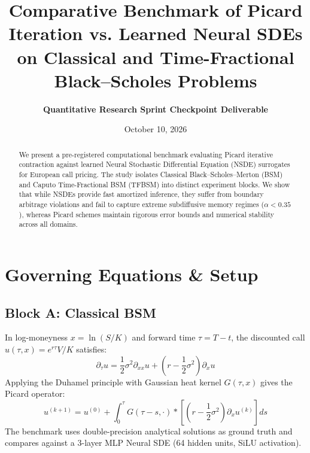 \documentclass[10pt,twocolumn,a4paper]{article}
\title{\textbf{Comparative Benchmark of Picard Iteration vs. Learned Neural SDEs on Classical and Time-Fractional Black--Scholes Problems}}
\author{\textbf{Quantitative Research Sprint Checkpoint Deliverable}}
\date{October 10, 2026}
\begin{document}
\maketitle

\begin{abstract}
We present a pre-registered computational benchmark evaluating Picard iterative contraction against learned Neural Stochastic Differential Equation (NSDE) surrogates for European call pricing. The study isolates Classical Black--Scholes--Merton (BSM) and Caputo Time-Fractional BSM (TFBSM) into distinct experiment blocks. We show that while NSDEs provide fast amortized inference, they suffer from boundary arbitrage violations and fail to capture extreme subdiffusive memory regimes ($\alpha < 0.35$), whereas Picard schemes maintain rigorous error bounds and numerical stability across all domains.
\end{abstract}

\begin{center}
\noindent{}
\end{center}
\vspace{1em}

\section{Governing Equations \& Setup}
\subsection{Block A: Classical BSM}
In log-moneyness $x = \ln(S/K)$ and forward time $\tau = T - t$, the discounted call $u(\tau, x) = e^{r\tau} V/K$ satisfies:
\begin{equation}
\partial_\tau u = \frac{1}{2}\sigma^2 \partial_{xx} u + \left(r - \frac{1}{2}\sigma^2\right)\partial_x u
\end{equation}
Applying the Duhamel principle with Gaussian heat kernel $G(\tau, x)$ gives the Picard operator:
\begin{equation}
u^{(k+1)} = u^{(0)} + \int_0^\tau G(\tau-s, \cdot) * \left[\left(r - \frac{1}{2}\sigma^2\right) \partial_x u^{(k)}\right] ds
\end{equation}
The benchmark uses double-precision analytical solutions as ground truth and compares against a 3-layer MLP Neural SDE (64 hidden units, SiLU activation).
\end{document}
